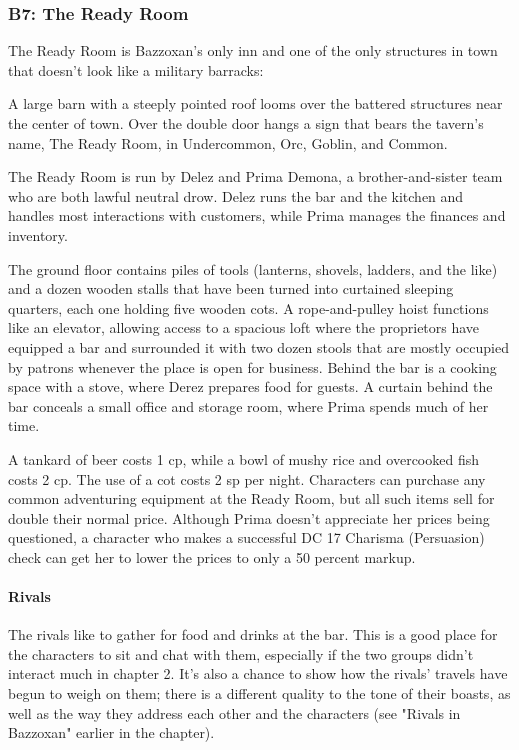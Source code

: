 \documentclass[10pt,a4paper,twoside,bg=print,twocolumn,openany,nodeprecatedcode]{dndbook}
\begin{document}
\subsubsection{B7: The Ready Room}
The Ready Room is Bazzoxan's only inn and one of the only structures in town that doesn't look like a military barracks:

\begin{DndReadAloud}{}
A large barn with a steeply pointed roof looms over the battered structures near the center of town. Over the double door hangs a sign that bears the tavern's name, The Ready Room, in Undercommon, Orc, Goblin, and Common.

\end{DndReadAloud}

The Ready Room is run by Delez and Prima Demona, a brother-and-sister team who are both lawful neutral drow. Delez runs the bar and the kitchen and handles most interactions with customers, while Prima manages the finances and inventory.

The ground floor contains piles of tools (lanterns, shovels, ladders, and the like) and a dozen wooden stalls that have been turned into curtained sleeping quarters, each one holding five wooden cots. A rope-and-pulley hoist functions like an elevator, allowing access to a spacious loft where the proprietors have equipped a bar and surrounded it with two dozen stools that are mostly occupied by patrons whenever the place is open for business. Behind the bar is a cooking space with a stove, where Derez prepares food for guests. A curtain behind the bar conceals a small office and storage room, where Prima spends much of her time.

A tankard of beer costs 1 cp, while a bowl of mushy rice and overcooked fish costs 2 cp. The use of a cot costs 2 sp per night. Characters can purchase any common adventuring equipment at the Ready Room, but all such items sell for double their normal price. Although Prima doesn't appreciate her prices being questioned, a character who makes a successful DC 17 Charisma (Persuasion) check can get her to lower the prices to only a 50 percent markup.

\paragraph{Rivals}
The rivals like to gather for food and drinks at the bar. This is a good place for the characters to sit and chat with them, especially if the two groups didn't interact much in chapter 2. It's also a chance to show how the rivals' travels have begun to weigh on them; there is a different quality to the tone of their boasts, as well as the way they address each other and the characters (see "Rivals in Bazzoxan" earlier in the chapter).
\end{document}
